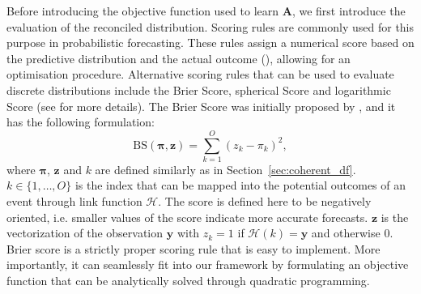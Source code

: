 \documentclass[a4paper,review,12pt,authoryear]{elsarticle}
\newcommand{\bpi}{\bm{\pi}}
\theoremstyle{definition}
\begin{document}
    Before introducing the objective function used to learn $\bm{A}$, we first introduce the evaluation of the reconciled distribution.
    Scoring rules are commonly used for this purpose in probabilistic forecasting.
    These rules assign a numerical score based on the predictive distribution and the actual outcome (\citealp{gneitingStrictlyProperScoring2007}), allowing for an optimisation procedure.
    Alternative scoring rules that can be used to evaluate discrete distributions include the Brier Score, spherical Score and logarithmic Score (see \citealp{gneitingStrictlyProperScoring2007} for more details).
    The Brier Score was initially proposed by \cite{brier1950verification}, and it has the following formulation:
    \[
      \text{BS}(\bpi, \mathbf{z}) = \sum_{k=1}^{O}(z_k - \pi_k)^2,
    \] where $\bpi$, $\mathbf{z}$ and $k$ are defined similarly as in Section~\ref{sec:coherent_df}.
    $k\in \{1,\dots,O\}$ is the index that can be mapped into the potential outcomes of an event through link function $\mathcal{H}$. The score is defined here to be negatively oriented, i.e. smaller values of the score indicate more accurate forecasts.    $\mathbf{z}$ is the vectorization of the observation $\mathbf{y}$ with $z_k = 1$ if $\mathcal{H}(k) = \mathbf{y}$ and otherwise $0$.
    Brier score is a strictly proper scoring rule that is easy to implement.
    More importantly, it can seamlessly fit into our framework by formulating an objective function that can be analytically solved through quadratic programming.
\end{document}
